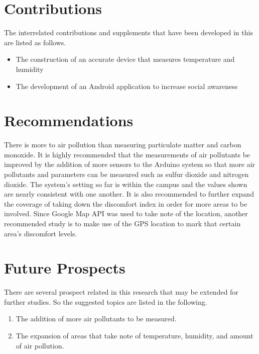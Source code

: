 \section{Contributions}

The interrelated  contributions and supplements that have been developed in this \documentType  are listed as follows.

\begin{itemize}
  \item The construction of an accurate device that measures temperature and humidity
	
	\item The development of an Android application to increase social awareness
  
	
\end{itemize}


\section{Recommendations}

There is more to air pollution than measuring particulate matter and carbon monoxide. It is highly recommended that the measurements of air pollutants be improved by the addition of more sensors to the Arduino system so that more air pollutants and parameters can be measured such as sulfur dioxide and nitrogen dioxide. The system's setting so far is within the campus and the values shown are nearly consistent with one another. It is also recommended to further expand the coverage of taking down the discomfort index in order for more areas to be involved. Since Google Map API was used to take note of the location, another recommended study is to make use of the GPS location to mark that certain area's discomfort levels.

\section{Future Prospects}

There are several prospect related in this research that may be extended for further studies. So the suggested topics are listed in the following.

\begin{enumerate}
	\item  The addition of more air pollutants to be measured.
	
	\item  The expansion of areas that take note of temperature, humidity, and amount of air pollution.
		
\end{enumerate}


